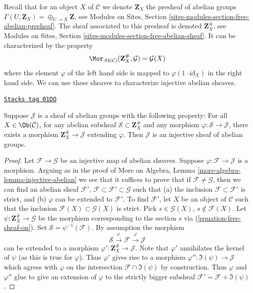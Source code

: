 Recall that for an object $X$ of $\mathcal{C}$ we denote $\mathbf{Z}_X$
the presheaf of abelian groups $\Gamma(U, \mathbf{Z}_X) =
\oplus_{U \to X} \mathbf{Z}$, see
Modules on Sites, Section \ref{sites-modules-section-free-abelian-presheaf}.
The sheaf associated to this presheaf
is denoted $\mathbf{Z}_X^\#$, see
Modules on Sites, Section \ref{sites-modules-section-free-abelian-sheaf}.
It can be characterized by
the property
\begin{equation}
\label{equation-free-sheaf-on}
\Mor_{\textit{Ab}(\mathcal{C})}(\mathbf{Z}_X^\#, \mathcal{G})
=
\mathcal{G}(X)
\end{equation}
where the element $\varphi$ of the left hand side is mapped
to $\varphi(1 \cdot \text{id}_X)$ in the right hand side. We can use these
sheaves to characterize injective abelian sheaves.

\begin{lemma}
\label{injectives-lemma-characterize-injectives}
\href{https://stacks.math.columbia.edu/tag/01DO}{\texttt{Stacks tag 01DO}}

Suppose $\mathcal{J}$ is a sheaf of abelian groups with the following
property: For all $X\in \Ob(\mathcal{C})$, for any abelian subsheaf
$\mathcal{S} \subset \mathbf{Z}_X^\#$ and any morphism
$\varphi : \mathcal{S} \to \mathcal{J}$, there exists a morphism
$\mathbf{Z}_X^\# \to \mathcal{J}$ extending $\varphi$.
Then $\mathcal{J}$ is an injective sheaf of abelian groups.
\end{lemma}

\begin{proof}
Let $\mathcal{F} \to \mathcal{G}$ be an injective map
of abelian sheaves. Suppose $\varphi : \mathcal{F} \to \mathcal{J}$
is a morphism. Arguing as in the proof of
More on Algebra, Lemma \ref{more-algebra-lemma-injective-abelian}
we see that it suffices
to prove that if $\mathcal{F} \not = \mathcal{G}$, then we
can find an abelian sheaf $\mathcal{F}'$,
$\mathcal{F} \subset \mathcal{F}' \subset \mathcal{G}$
such that (a) the inclusion $\mathcal{F} \subset \mathcal{F}'$ is strict,
and (b) $\varphi$ can be extended to $\mathcal{F}'$.
To find $\mathcal{F}'$, let $X$ be an object of $\mathcal{C}$ such
that the inclusion $\mathcal{F}(X) \subset \mathcal{G}(X)$
is strict. Pick $s \in \mathcal{G}(X)$, $s \not \in \mathcal{F}(X)$.
Let $\psi : \mathbf{Z}_X^\# \to \mathcal{G}$ be the morphism corresponding
to the section $s$ via (\ref{equation-free-sheaf-on}). Set
$\mathcal{S} = \psi^{-1}(\mathcal{F})$. By assumption the morphism
$$
\mathcal{S} \xrightarrow{\psi} \mathcal{F} \xrightarrow{\varphi} \mathcal{J}
$$
can be extended to a morphism $\varphi' : \mathbf{Z}_X^\# \to \mathcal{J}$.
Note that $\varphi'$ annihilates the kernel of $\psi$ (as this is true
for $\varphi$). Thus $\varphi'$ gives rise to a morphism
$\varphi'' : \Im(\psi) \to \mathcal{J}$
which agrees with $\varphi$ on the intersection
$\mathcal{F} \cap \Im(\psi)$ by construction.
Thus $\varphi$ and $\varphi''$ glue to give an extension
of $\varphi$ to the strictly bigger subsheaf
$\mathcal{F}' = \mathcal{F} + \Im(\psi)$.
\end{proof}

